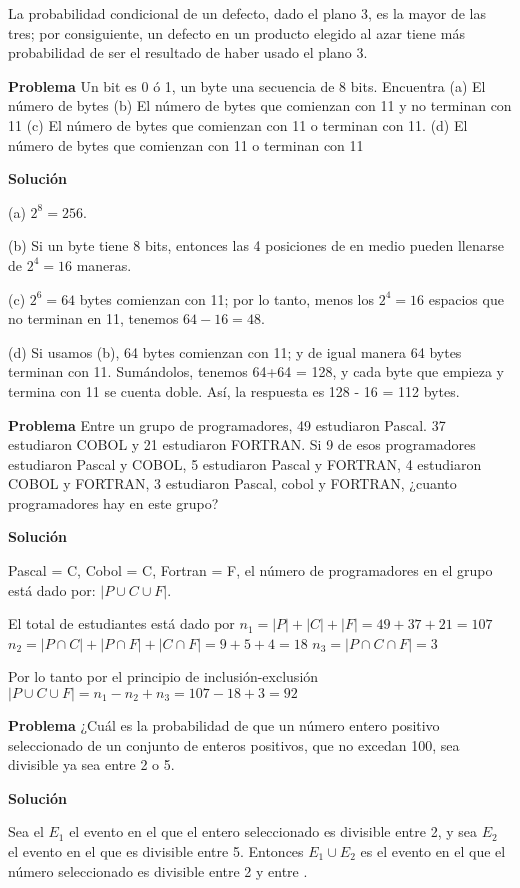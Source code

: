 La probabilidad condicional de un defecto, dado el plano 3, es la mayor de las
tres; por consiguiente, un defecto en un producto elegido al azar tiene más
probabilidad de ser el resultado de haber usado el plano 3.

\textbf{Problema}
Un bit es 0 ó 1, un byte una secuencia de 8 bits. Encuentra (a) El número de
bytes (b) El número de bytes que comienzan con 11 y no terminan con 11 (c) El
número de bytes que comienzan con 11 o terminan con 11. (d) El número de bytes
que comienzan con 11 o terminan con 11

\textbf{Solución}\

(a) $2^8 = 256$.

(b) Si un byte tiene 8 bits, entonces las 4 posiciones de en medio pueden
llenarse de $2^4 = 16$ maneras. 

(c) $2^6 = 64$ bytes comienzan con 11; por lo tanto, menos los $2^4 = 16$
espacios que no terminan en 11, tenemos $64 - 16 = 48$.

(d) Si usamos (b), 64 bytes comienzan con 11; y de igual manera 64 bytes
terminan con 11. Sumándolos, tenemos 64+64 = 128, y cada byte que empieza y
termina con 11 se cuenta doble. Así, la respuesta es 128 - 16 = 112 bytes. 

\textbf{Problema}
Entre un grupo de programadores, 49 estudiaron Pascal. 37 estudiaron COBOL y 21
estudiaron FORTRAN. Si 9 de esos programadores estudiaron Pascal y COBOL, 5
estudiaron Pascal y FORTRAN, 4 estudiaron COBOL y FORTRAN, 3 estudiaron Pascal,
cobol y FORTRAN, ¿cuanto programadores hay en este grupo?

\textbf{Solución}

Pascal = C, Cobol = C, Fortran = F, el número de programadores en el grupo está
dado por: $|P \cup C \cup F|$.

El total de estudiantes está dado por $n_1 = |P|+|C|+|F| = 49+37+21=107$ $n_2
=|P \cap C| + |P \cap F| + |C \cap F| = 9+5+4 = 18$ $n_3 = |P \cap C \cap F| =
3$

Por lo tanto por el principio de inclusión-exclusión $|P \cup C \cup F| = n_1 - n_2 +
n_3 = 107-18+3 = 92$

\textbf{Problema}
¿Cuál es la probabilidad de que un número entero positivo seleccionado de un
conjunto de enteros positivos, que no excedan 100, sea divisible ya sea entre 2
o 5. 

\textbf{Solución}

Sea el $E_1$ el evento en el que el entero seleccionado es divisible entre 2, y
sea $E_2$ el evento en el que es divisible entre 5. Entonces $E_1 \cup E_2$ es
el evento en el que el número seleccionado es divisible entre 2 y entre .

